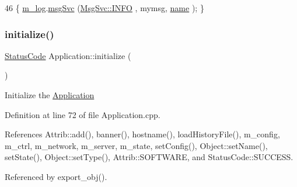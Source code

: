 \begin{DoxyCode}
46 \{ \hyperlink{classObject_a0d269813dd7ac1f24bc143031e2963f2}{m\_log}.\hyperlink{classMsgSvc_ad25f18047920cc59a314e5098259711c}{msgSvc} (\hyperlink{classMsgSvc_ae671eb7301996cd049d2da8a65925926ad2fcf3f3e734fc41ee097cc23670ce51}{MsgSvc::INFO}    , mymsg, \hyperlink{classObject_a300f4c05dd468c7bb8b3c968868443c1}{name} ); \}
\end{DoxyCode}
\mbox{\label{classApplication_a86b8cbb104f3e04516ef574e5822ff82}} 
\subsubsection{\texorpdfstring{initialize()}{initialize()}}
{\footnotesize\ttfamily \hyperlink{classStatusCode}{Status\+Code} Application\+::initialize (\begin{DoxyParamCaption}{ }\end{DoxyParamCaption})}

Initialize the \hyperlink{classApplication}{Application} 

Definition at line 72 of file Application.\+cpp.



References Attrib\+::add(), banner(), hostname(), load\+History\+File(), m\+\_\+config, m\+\_\+ctrl, m\+\_\+network, m\+\_\+server, m\+\_\+state, set\+Config(), Object\+::set\+Name(), set\+State(), Object\+::set\+Type(), Attrib\+::\+S\+O\+F\+T\+W\+A\+RE, and Status\+Code\+::\+S\+U\+C\+C\+E\+SS.



Referenced by export\+\_\+obj().


